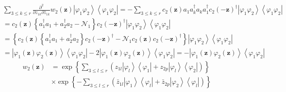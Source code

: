 \documentclass[aps,preprint]{revtex4}%
\begin{document}
\begin{align}
& \sum_{3\leq k\leq r}\frac{\partial^{2}}{\partial z_{1k}\partial\bar{z}_{1k}%
}w_{2}\left(  \mathbf{z}\right)  \left\vert \varphi_{1}\varphi_{2}%
\right\rangle \left\langle \varphi_{1}\varphi_{2}\right\vert =-\sum_{3\leq
k\leq r}c_{2}\left(  \mathbf{z}\right)  a_{1}a_{k}^{\dagger}a_{k}%
a_{1}^{\dagger}c_{2}\left(  -\mathbf{z}\right)  ^{\dagger}\left\vert
\varphi_{1}\varphi_{2}\right\rangle \left\langle \varphi_{1}\varphi
_{2}\right\vert \\
& =c_{2}\left(  \mathbf{z}\right)  \left\{  a_{1}^{\dagger}a_{1}%
+a_{2}^{\dagger}a_{2}-\mathcal{N}_{1}\right\}  c_{2}\left(  -\mathbf{z}%
\right)  ^{\dagger}\left\vert \varphi_{1}\varphi_{2}\right\rangle \left\langle
\varphi_{1}\varphi_{2}\right\vert \\
& =\left\{  c_{2}\left(  \mathbf{z}\right)  \left\{  a_{1}^{\dagger}%
a_{1}+a_{2}^{\dagger}a_{2}\right\}  c_{2}\left(  -\mathbf{z}\right)
^{\dagger}-\mathcal{N}_{1}c_{2}\left(  \mathbf{z}\right)  c_{2}\left(
-\mathbf{z}\right)  ^{\dagger}\right\}  \left\vert \varphi_{1}\varphi
_{2}\right\rangle \left\langle \varphi_{1}\varphi_{2}\right\vert \\
& =\left\vert \varphi_{1}\left(  \mathbf{z}\right)  \varphi_{2}\left(
\mathbf{z}\right)  \right\rangle \left\langle \varphi_{1}\varphi
_{2}\right\vert -2\left\vert \varphi_{1}\left(  \mathbf{z}\right)  \varphi
_{2}\left(  \mathbf{z}\right)  \right\rangle \left\langle \varphi_{1}%
\varphi_{2}\right\vert =-\left\vert \varphi_{1}\left(  \mathbf{z}\right)
\varphi_{2}\left(  \mathbf{z}\right)  \right\rangle \left\langle \varphi
_{1}\varphi_{2}\right\vert
\end{align}%
\begin{align}
w_{2}\left(  \mathbf{z}\right)    & =\exp\left\{  \sum_{3\leq l\leq r}\left(
z_{1l}\left\vert \varphi_{l}\right\rangle \left\langle \varphi_{1}\right\vert
+z_{2p}\left\vert \varphi_{l}\right\rangle \left\langle \varphi_{2}\right\vert
\right)  \right\}  \\
& \times\exp\left\{  -\sum_{3\leq l\leq r}\left(  \bar{z}_{1l}\left\vert
\varphi_{1}\right\rangle \left\langle \varphi_{l}\right\vert +\bar{z}%
_{2p}\left\vert \varphi_{2}\right\rangle \left\langle \varphi_{l}\right\vert
\right)  \right\}
\end{align}%
\end{document}
